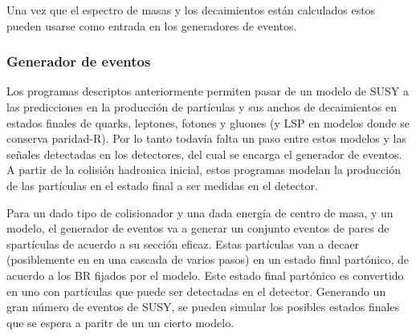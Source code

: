 
Una vez que el espectro de masas y los decaimientos están calculados estos
pueden usarse como entrada en los generadores de eventos.




\subsubsection{Generador de eventos}

Los programas descriptos anteriormente permiten pasar de un modelo de SUSY a las
predicciones en la producción de partículas y sus anchos de decaimientos en
estados finales de quarks, leptones, fotones y gluones (y LSP en modelos donde
se conserva paridad-R).
Por lo tanto todavía falta un paso
entre estos modelos y las señales detectadas en los detectores, del cual se
encarga el generador de eventos. A partir de la colisión hadronica inicial,
estos programas modelan la producción de las partículas en el estado final a ser
medidas en el detector.

Para un dado tipo de colisionador y una dada energía de centro de masa, y un
modelo, el generador de eventos va a generar un conjunto eventos de pares de
spartículas de acuerdo a su sección eficaz. Estas partículas van a decaer
(posiblemente en en una cascada de varios pasos) en un estado final partónico,
de acuerdo a los BR fijados por el modelo. Este estado final partónico es
convertido en uno con partículas que puede ser detectadas en el detector.
Generando un gran número de eventos de SUSY, se pueden simular los posibles
estados finales que se espera a paritr de un un cierto modelo.

